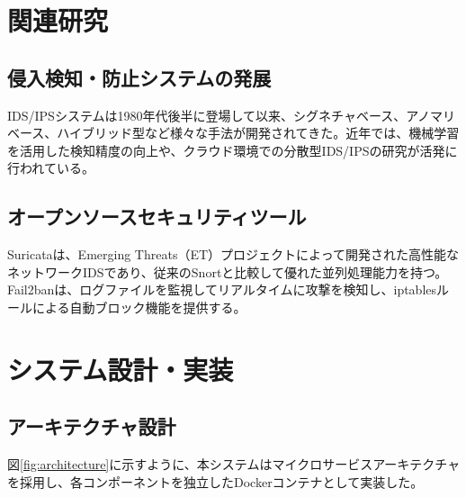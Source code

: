 \documentclass[12pt,a4paper]{article}
\begin{document}
\section{関連研究}

\subsection{侵入検知・防止システムの発展}
IDS/IPSシステムは1980年代後半に登場して以来、シグネチャベース、アノマリベース、ハイブリッド型など様々な手法が開発されてきた\cite{debar2000intrusion}。近年では、機械学習を活用した検知精度の向上や、クラウド環境での分散型IDS/IPSの研究が活発に行われている。

\subsection{オープンソースセキュリティツール}
Suricataは、Emerging Threats（ET）プロジェクトによって開発された高性能なネットワークIDSであり、従来のSnortと比較して優れた並列処理能力を持つ\cite{albin2014suricata}。Fail2banは、ログファイルを監視してリアルタイムに攻撃を検知し、iptablesルールによる自動ブロック機能を提供する。

\section{システム設計・実装}

\subsection{アーキテクチャ設計}

図\ref{fig:architecture}に示すように、本システムはマイクロサービスアーキテクチャを採用し、各コンポーネントを独立したDockerコンテナとして実装した。
\end{document}
